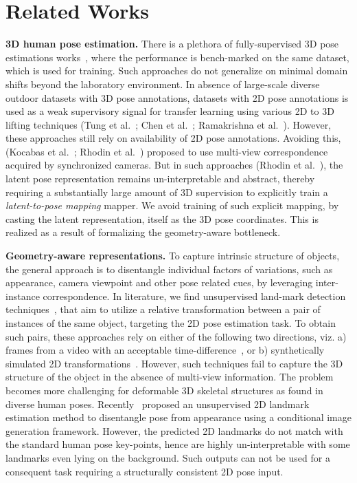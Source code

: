 \documentclass[letterpaper]{article} \usepackage{aaai20}  \usepackage{times}  \usepackage{helvet}  \usepackage{courier}  \usepackage{url}  \usepackage{graphicx}  \usepackage{amsmath}
\begin{document}
\section{Related Works}
\label{sec:related-works}
\textbf{3D human pose estimation.}
There is a plethora of fully-supervised 3D pose estimations works~\cite{fang2018learning,mehta2017monocular,VNect_SIGGRAPH2017}, where the performance is bench-marked on the same dataset, which is used for training. Such approaches do not generalize on minimal domain shifts beyond the laboratory environment. In absence of large-scale diverse outdoor datasets with 3D pose annotations, datasets with 2D pose annotations is used as a weak supervisory signal for transfer learning using various 2D to 3D lifting techniques ({\color{coolblack}Tung et al.~\citeyear{tung2017adversarial}}; {\color{coolblack}Chen et al.~\citeyear{chen20173d}}; {\color{coolblack}Ramakrishna et al.~\citeyear{ramakrishna2012}}). However, these approaches still rely on availability of 2D pose annotations. Avoiding this, ({\color{coolblack}Kocabas et al.~\citeyear{kocabas2019self}}; {\color{coolblack}Rhodin et al.~\citeyear{rhodin2018unsupervised}}) proposed to use multi-view correspondence acquired by synchronized cameras. But in such approaches ({\color{coolblack}Rhodin et al.~\citeyear{rhodin2018unsupervised}}), the latent pose representation remains un-interpretable and abstract, thereby requiring a substantially large amount of 3D supervision to explicitly train a \textit{latent-to-pose mapping} mapper. We avoid training of such explicit mapping, by casting the latent representation, itself as the 3D pose coordinates. This is realized as a result of formalizing the geometry-aware bottleneck.

\textbf{Geometry-aware representations.}
To capture intrinsic structure of objects, the general approach is to disentangle individual factors of variations, such as appearance, camera viewpoint and other pose related cues, by leveraging inter-instance correspondence. In literature, we find unsupervised land-mark detection techniques~\cite{zhang2018unsupervised}, that aim to utilize a relative transformation between a pair of instances of the same object, targeting the 2D pose estimation task. To obtain such pairs, these approaches rely on either of the following two directions, viz. a) frames from a video with an acceptable time-difference~\cite{jakab2018unsupervised}, or b) synthetically simulated 2D transformations~\cite{rocco2017convolutional}. However, such techniques fail to capture the 3D structure of the object in the absence of multi-view information. The problem becomes more challenging for deformable 3D skeletal structures as found in diverse human poses. Recently~\cite{jakab2018unsupervised} proposed an unsupervised 2D landmark estimation method to disentangle pose from appearance using a conditional image generation framework. However, the predicted 2D landmarks do not match with the standard human pose key-points, hence are highly un-interpretable with some landmarks even lying on the background. Such outputs can not be used for a consequent task requiring a structurally consistent 2D pose input. 
\end{document}
